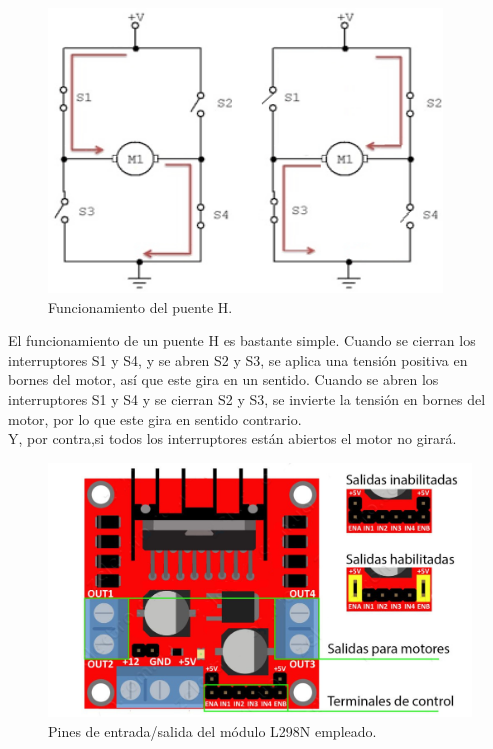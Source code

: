\begin{figure}[H]
  \begin{center}
    \includegraphics[scale=2]{imagenes/esquema_puente_h.png}
  \end{center}
  \caption{Funcionamiento del puente H.}
  \label{esquema:puente_h}
\end{figure}

El funcionamiento de un puente H es  bastante  simple. Cuando se cierran los interruptores S1 y S4, y se abren S2 y S3, se aplica una tensión positiva en bornes del motor, así 
que este gira en un sentido. Cuando se abren los interruptores S1 y S4 y se cierran S2 y S3, se invierte la tensión en bornes del motor, por lo que este gira en sentido contrario.\\

Y, por contra,si todos los interruptores están abiertos el motor no girará. \\



\begin{figure}[H]
  \begin{center}
    \includegraphics[scale=2]{imagenes/L298N-conexiones.jpg}
  \end{center}
  \caption{Pines de entrada/salida del módulo L298N empleado.}
  \label{diagrama:L298N-salidas}
\end{figure}


